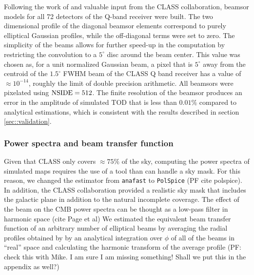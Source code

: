 \documentclass[a4paper,11pt]{article}
\begin{document}
Following the work of \cite{2012SPIE.8452E..20E} and valuable input from the CLASS collaboration, beamsor models for all 72 detectors of the Q-band receiver were built. The two dimensional profile of the diagonal beamsor elements correspond to purely elliptical Gaussian profiles, while the off-diagonal terms were set to zero. The simplicity of the beams allows for further speed-up in the computation by restricting the convolution to a $5^\circ$ disc around the beam center. This value was chosen as, for a unit normalized Gaussian beam, a pixel that is $5^\circ$ away from the centroid of the $1.5^{\circ}$ FWHM beam of the CLASS Q band receiver has a value of $\approx 10^{-14}$, roughly the limit of double precision arithmetic. All beamsors were pixelated using $\rm{NSIDE}=512$. The finite resolution of the beamsor produces an error in the amplitude of simulated TOD that is less than $0.01\%$ compared to analytical estimations, which is consistent with the results described in section \ref{sec::validation}.


\subsubsection{Power spectra and beam transfer function}

Given that CLASS only covers $\approx 75\%$ of the sky, computing the power spectra of simulated maps requires the use of a tool than can handle a sky mask. For this reason, we changed the estimator from \texttt{anafast} to \texttt{PolSpice} (PF cite polspice). In addition, the CLASS collaboration provided a realistic sky mask that includes the galactic plane in addition to the natural incomplete coverage. The effect of the beam on the CMB power spectra can be thought as a low-pass filter in harmonic space (cite Page et al) We estimated the equivalent beam transfer function of an arbitrary number of elliptical beams by averaging the radial profiles obtained by by an analytical integration over $\phi$ of all of the beams in ``real'' space and calculating the harmonic transform of the average profile (PF: check this with Mike. I am sure I am missing something! Shall we put this in the appendix as well?)
\end{document}
